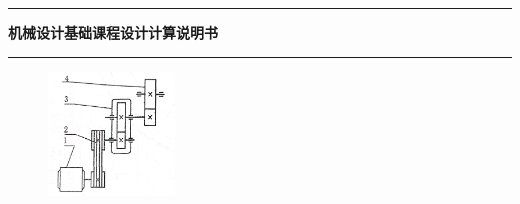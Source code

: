 
\begin{titlepage}
\centering %

    \rule{\textwidth}{1pt}   %


    
    
    
    \vspace{0.01\textheight}
    
    {\Huge \textbf{机械设计基础课程设计计算说明书}}

    \rule{0.83\textwidth}{0.4pt}  %
    
    
     
      
    \begin{figure}[H] %
        \centering
        \includegraphics[width=0.3\textwidth]{figure/传动简图.png} 
    \end{figure}
    

\end{titlepage}
